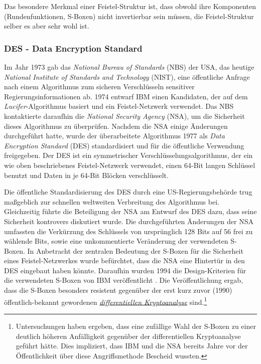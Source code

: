 
Das besondere Merkmal einer Feistel-Struktur ist, dass obwohl ihre Komponenten (Rundenfunktionen, S-Boxen) nicht invertierbar sein müssen, die Feistel-Struktur selber es aber sehr wohl ist.

\subsubsection{DES - Data Encryption Standard}
\label{sssec:des}
Im Jahr 1973 gab das \emph{National Bureau of Standards} (NBS) der USA, das heutige \emph{National Institute of Standards and Technology} (NIST), eine öffentliche Anfrage nach einem Algorithmus zum sicheren Verschlüsseln sensitiver Regierungsinformationen ab. 1974 entwarf IBM einen Kandidaten, der auf dem \emph{Lucifer}-Algorithmus basiert und ein Feistel-Netzwerk verwendet. Das NBS kontaktierte daraufhin die \emph{National Security Agency} (NSA), um die Sicherheit dieses Algorithmus zu überprüfen. Nachdem die NSA einige Änderungen durchgeführt hatte, wurde der überarbeitete Algorithmus 1977 als \emph{Data Encryption Standard} (DES) \cite{NIST_DES99} standardisiert und für die öffentliche Verwendung freigegeben. Der DES ist ein symmetrischer Verschlüsselungsalgorithmus, der ein wie oben beschriebenes Feistel-Netzwerk verwendet, einen 64-Bit langen Schlüssel benutzt und Daten in je 64-Bit Blöcken verschlüsselt. 

Die öffentliche Standardisierung des DES durch eine US-Regierungsbehörde trug maßgeblich zur schnellen weltweiten Verbreitung des Algorithmus bei. Gleichzeitig führte die Beteiligung der NSA am Entwurf des DES dazu, dass seine Sicherheit kontrovers diskutiert wurde. Die durchgeführten Änderungen der NSA umfassten die Verkürzung des Schlüssels von ursprünglich 128 Bits auf 56 frei zu wählende Bits, sowie eine unkommentierte Veränderung der verwendeten S-Boxen. In Anbetracht der zentralen Bedeutung der S-Boxen für die Sicherheit eines Feistel-Netzwerkes wurde befürchtet, dass die NSA eine Hintertür in den DES eingebaut haben könnte. Daraufhin wurden 1994 die Design-Kriterien für die verwendeten S-Boxen von IBM veröffentlicht \cite{Coppersmith1994}. Die Veröffentlichung ergab, dass die S-Boxen besonders resistent gegenüber der erst kurz zuvor (1990) öffentlich-bekannt gewordenen \hyperref[sssec:diffKryptoanalyse]{\textit{differentiellen Kryptoanalyse}} sind.\footnote{Untersuchungen haben ergeben, dass eine zufällige Wahl der S-Boxen zu einer deutlich höheren Anfälligkeit gegenüber der differentiellen Kryptoanalyse geführt hätte. Dies impliziert, dass IBM und die NSA bereits Jahre vor der Öffentlichkeit über diese Angriffsmethode Bescheid wussten.}

